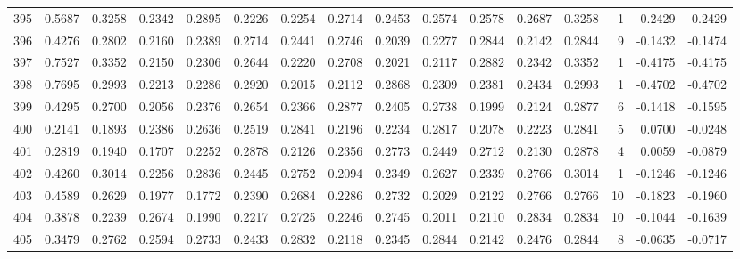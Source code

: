\begin{tabular}{lrrrrrrrrrrrrrrr}
395 &      0.5687 &  0.3258 &  0.2342 &  0.2895 &  0.2226 &  0.2254 &  0.2714 &  0.2453 &  0.2574 &  0.2578 &   0.2687 &     0.3258 &      1 &                   -0.2429 &                    -0.2429 \\
396 &      0.4276 &  0.2802 &  0.2160 &  0.2389 &  0.2714 &  0.2441 &  0.2746 &  0.2039 &  0.2277 &  0.2844 &   0.2142 &     0.2844 &      9 &                   -0.1432 &                    -0.1474 \\
397 &      0.7527 &  0.3352 &  0.2150 &  0.2306 &  0.2644 &  0.2220 &  0.2708 &  0.2021 &  0.2117 &  0.2882 &   0.2342 &     0.3352 &      1 &                   -0.4175 &                    -0.4175 \\
398 &      0.7695 &  0.2993 &  0.2213 &  0.2286 &  0.2920 &  0.2015 &  0.2112 &  0.2868 &  0.2309 &  0.2381 &   0.2434 &     0.2993 &      1 &                   -0.4702 &                    -0.4702 \\
399 &      0.4295 &  0.2700 &  0.2056 &  0.2376 &  0.2654 &  0.2366 &  0.2877 &  0.2405 &  0.2738 &  0.1999 &   0.2124 &     0.2877 &      6 &                   -0.1418 &                    -0.1595 \\
400 &      0.2141 &  0.1893 &  0.2386 &  0.2636 &  0.2519 &  0.2841 &  0.2196 &  0.2234 &  0.2817 &  0.2078 &   0.2223 &     0.2841 &      5 &                    0.0700 &                    -0.0248 \\
401 &      0.2819 &  0.1940 &  0.1707 &  0.2252 &  0.2878 &  0.2126 &  0.2356 &  0.2773 &  0.2449 &  0.2712 &   0.2130 &     0.2878 &      4 &                    0.0059 &                    -0.0879 \\
402 &      0.4260 &  0.3014 &  0.2256 &  0.2836 &  0.2445 &  0.2752 &  0.2094 &  0.2349 &  0.2627 &  0.2339 &   0.2766 &     0.3014 &      1 &                   -0.1246 &                    -0.1246 \\
403 &      0.4589 &  0.2629 &  0.1977 &  0.1772 &  0.2390 &  0.2684 &  0.2286 &  0.2732 &  0.2029 &  0.2122 &   0.2766 &     0.2766 &     10 &                   -0.1823 &                    -0.1960 \\
404 &      0.3878 &  0.2239 &  0.2674 &  0.1990 &  0.2217 &  0.2725 &  0.2246 &  0.2745 &  0.2011 &  0.2110 &   0.2834 &     0.2834 &     10 &                   -0.1044 &                    -0.1639 \\
405 &      0.3479 &  0.2762 &  0.2594 &  0.2733 &  0.2433 &  0.2832 &  0.2118 &  0.2345 &  0.2844 &  0.2142 &   0.2476 &     0.2844 &      8 &                   -0.0635 &                    -0.0717 \\

\end{tabular}
